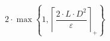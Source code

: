 \[2 \cdot \max\left\{ 1, \left\lceil \frac{2 \cdot L \cdot D^{2}}{\varepsilon} \right\rceil_{+} \right\}\]
